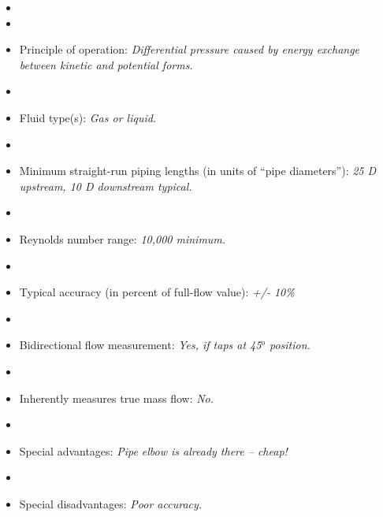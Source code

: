 \begin{itemize}
\goodbreak
\item{} 
\vskip 5pt
\item\item{} Principle of operation: {\it Differential pressure caused by energy exchange between kinetic and potential forms.}
\vskip 5pt
\item\item{} Fluid type(s): {\it Gas or liquid.}
\vskip 5pt
\item\item{} Minimum straight-run piping lengths (in units of ``pipe diameters''): {\it 25 D upstream, 10 D downstream typical.}
\vskip 5pt
\item\item{} Reynolds number range: {\it 10,000 minimum.}
\vskip 5pt
\item\item{} Typical accuracy (in percent of full-flow value): {\it +/- 10\%}
\vskip 5pt
\item\item{} Bidirectional flow measurement: {\it Yes, if taps at 45$^{o}$ position.}
\vskip 5pt
\item\item{} Inherently measures true mass flow: {\it No.}
\vskip 5pt
\item\item{} Special advantages: {\it Pipe elbow is already there -- cheap!}
\vskip 5pt
\item\item{} Special disadvantages: {\it Poor accuracy.}
\end{itemize}

